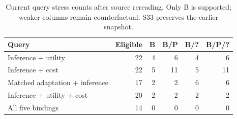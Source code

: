 \begin{table}[ht]\centering\small
\caption{Current query stress counts after source rereading. Only B is supported; weaker columns remain counterfactual. S33 preserves the earlier snapshot.}\label{tab:r26-current-stress}
\begin{tabular}{@{}lrrrrr@{}}\toprule Query & Eligible & B & B/P & B/? & B/P/?\\\midrule
Inference + utility & 22 & 4 & 6 & 4 & 6\\
Inference + cost & 22 & 5 & 11 & 5 & 11\\
Matched adaptation + inference & 17 & 2 & 2 & 6 & 6\\
Inference + utility + cost & 20 & 2 & 2 & 2 & 2\\
All five bindings & 14 & 0 & 0 & 0 & 0\\
\bottomrule\end{tabular}\end{table}
